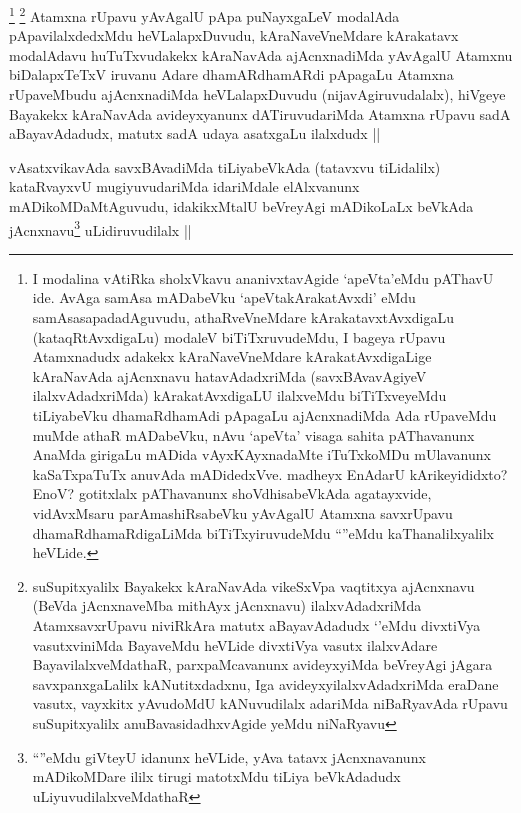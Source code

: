 \begin{artha}
\footnote{I modalina vAtiRka sholxVkavu ananivxtavAgide `apeVta'eMdu pAThavU ide. AvAga samAsa mADabeVku `apeVtakArakatAvxdi' eMdu samAsasapadadAguvudu, athaRveVneMdare kArakatavxtAvxdigaLu (kataqRtAvxdigaLu) modaleV biTiTxruvudeMdu, I bageya rUpavu Atamxnadudx adakekx kAraNaveVneMdare kArakatAvxdigaLige kAraNavAda ajAcnxnavu hatavAdadxriMda (savxBAvavAgiyeV ilalxvAdadxriMda) kArakatAvxdigaLU ilalxveMdu biTiTxveyeMdu tiLiyabeVku dhamaRdhamAdi pApagaLu ajAcnxnadiMda Ada rUpaveMdu muMde athaR mADabeVku, nAvu `apeVta' visaga sahita pAThavanunx AnaMda girigaLu mADida vAyxKAyxnadaMte iTuTxkoMDu mUlavanunx kaSaTxpaTuTx anuvAda mADidedxVve. madheyx EnAdarU kArikeyididxto? EnoV? gotitxlalx pAThavanunx shoVdhisabeVkAda agatayxvide, vidAvxMsaru parAmashiRsabeVku yAvAgalU Atamxna savxrUpavu dhamaRdhamaRdigaLiMda biTiTxyiruvudeMdu ``\stext''eMdu kaThanalilxyalilx heVLide.}
\footnote{suSupitxyalilx Bayakekx kAraNavAda vikeSxVpa vaqtitxya ajAcnxnavu (BeVda jAcnxnaveMba mithAyx jAcnxnavu) ilalxvAdadxriMda AtamxsavxrUpavu niviRkAra matutx aBayavAdadudx `\stext'eMdu divxtiVya vasutxviniMda BayaveMdu heVLide divxtiVya vasutx ilalxvAdare BayavilalxveMdathaR, parxpaMcavanunx avideyxyiMda beVreyAgi jAgara savxpanxgaLalilx kANutitxdadxnu, Iga avideyxyilalxvAdadxriMda eraDane vasutx, vayxkitx yAvudoMdU kANuvudilalx adariMda niBaRyavAda rUpavu suSupitxyalilx anuBavasidadhxvAgide yeMdu niNaRyavu}
Atamxna rUpavu yAvAgalU pApa puNayxgaLeV modalAda pApavilalxdedxMdu heVLalapxDuvudu, kAraNaveVneMdare kArakatavx modalAdavu huTuTxvudakekx kAraNavAda ajAcnxnadiMda yAvAgalU Atamxnu biDalapxTeTxV iruvanu Adare dhamARdhamARdi pApagaLu Atamxna rUpaveMbudu ajAcnxnadiMda heVLalapxDuvudu (nijavAgiruvudalalx), hiVgeye Bayakekx kAraNavAda avideyxyanunx dATiruvudariMda Atamxna rUpavu sadA aBayavAdadudx, matutx sadA udaya asatxgaLu ilalxdudx ||
\end{artha}


\begin{artha}
vAsatxvikavAda savxBAvadiMda tiLiyabeVkAda (tatavxvu tiLidalilx) kataRvayxvU mugiyuvudariMda idariMdale elAlxvanunx mADikoMDaMtAguvudu, idakikxMtalU beVreyAgi mADikoLaLx beVkAda jAcnxnavu\footnote{``\stext''eMdu giVteyU idanunx heVLide, yAva tatavx jAcnxnavanunx mADikoMDare ililx tirugi matotxMdu tiLiya beVkAdadudx uLiyuvudilalxveMdathaR} uLidiruvudilalx || 
\end{artha}

